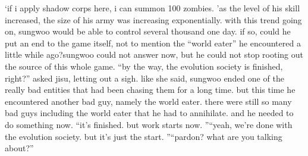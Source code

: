‘if i apply shadow corps here, i can summon 100 zombies.
’as the level of his skill increased, the size of his army was increasing exponentially.
with this trend going on, sungwoo would be able to control several thousand one day.
if so, could he put an end to the game itself, not to mention the “world eater” he encountered a little while ago?sungwoo could not answer now, but he could not stop rooting out the source of this whole game.
“by the way, the evolution society is finished, right?” asked jisu, letting out a sigh.
like she said, sungwoo ended one of the really bad entities that had been chasing them for a long time.
 but this time he encountered another bad guy, namely the world eater.
there were still so many bad guys including the world eater that he had to annihilate.
and he needed to do something now.
“it’s finished.
 but work starts now.
”“yeah, we’re done with the evolution society.
 but it’s just the start.
”“pardon? what are you talking about?”


